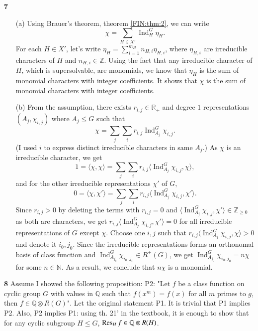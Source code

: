 \documentclass[a4paper, 12pt]{article}
\theoremstyle{Mydefinition}
\theoremstyle{Mytheorem}
\DeclareMathOperator{\Ind}{Ind}
\begin{document}
\noindent \textbf{7}
\begin{enumerate}
    \item[(a)]Using Brauer's theorem, theorem \ref{FIN:thm:2}, we can write
\begin{equation}
    \chi = \sum_{H\in X'}\Ind_H^G\eta_H.
\end{equation}
For each $H\in X'$, let's write $\eta_H = \sum_{i=1}^{m_H} n_{H,i}\eta_{H,i}$, where $\eta_{H,i}$ are irreducible characters of $H$ and $n_{H,i}\in\mathbb{Z}$. Using the fact that any irreducible character of $H$, which is supersolvable, are monomials, we know that $\eta_H$ is the sum of monomial characters with integer coefficients. It shows that $\chi$ is the sum of monomial characters with integer coefficients.
\item[(b)]From the assumption, there exists $r_{i,j}\in\mathbb{R}_+$ and degree $1$ representations $(A_j, \chi_{i,j})$ where $A_j\leq G$ such that
    \begin{equation}
        \chi = \sum_j \sum_i r_{i,j} \Ind_{A_j}^G \chi_{i,j}.
    \end{equation}
    (I used $i$ to express distinct irreducible characters in same $A_j$.) As $\chi$ is an irreducible character, we get
    \begin{equation}
        1=\langle \chi, \chi\rangle = \sum_j\sum_i r_{i,j} \langle \Ind_{A_j}^G \chi_{i,j}, \chi\rangle,
    \end{equation}
    and for the other irreducible representations $\chi'$ of $G$,
    \begin{equation}
        0=\langle \chi, \chi'\rangle = \sum_j\sum_i r_{i,j} \langle \Ind_{A_j}^G \chi_{i,j}, \chi'\rangle.
    \end{equation}
    Since $r_{i,j}>0$ by deleting the terms with $r_{i,j}=0$ and $\langle \Ind_{A_j}^G \chi_{i,j}, \chi'\rangle\in\mathbb{Z}_{\geq 0}$ as both are characters, we get $r_{i,j}\langle \Ind_{A_j}^G \chi_{i,j}, \chi'\rangle=0$ for all irreducible representations of $G$ except $\chi$. Choose one $i,j$ such that $r_{i,j}\langle \Ind_{A_j}^G \chi_{i,j}, \chi\rangle>0$ and denote it $i_0,j_0$. Since the irreducible representations forms an orthonomal basis of class function and $\Ind_{A_{j_0}}^G \chi_{i_0,j_0}\in R^+(G)$, we get $\Ind^G_{A_{j_0}} \chi_{i_0,j_0} = n\chi$ for some $n\in\mathbb{N}$. As a result, we conclude that $n\chi$ is a monomial.
\end{enumerate}

\noindent \textbf{8}
Assume I showed the following proposition: P2: "Let $f$ be a class function on cyclic group $G$ with values in $\mathbb{Q}$ such that $f(x^m)=f(x)$ for all $m$ primes to $g$, then $f\in \mathbb{Q}\otimes R(G)$". Let the original statement P1. It is trivial that P1 implies P2. Also, P2 implies P1: using th. 21' in the textbook, it is enough to show that for any cyclic subgroup $H\leq G$, $\Res_H f\in \mathbb{Q}\otimes R(H)$. 
\end{document}
